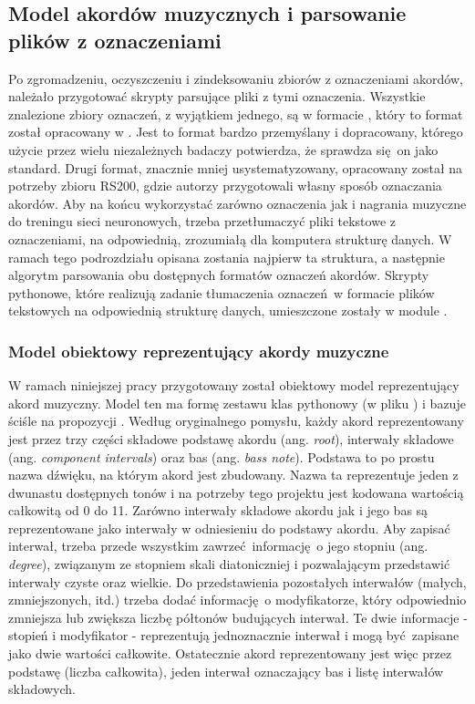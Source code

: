 \subsection{Model akordów muzycznych i parsowanie plików z oznaczeniami}

Po zgromadzeniu, oczyszczeniu i zindeksowaniu zbiorów z oznaczeniami akordów, należało przygotować
skrypty parsujące pliki z tymi oznaczenia. Wszystkie znalezione zbiory oznaczeń, z wyjątkiem
jednego, są w formacie , który to format został opracowany w \cite{harte_towards_nodate}.
Jest to format bardzo przemyślany i dopracowany, którego użycie przez wielu niezależnych badaczy
potwierdza, że sprawdza się on jako standard. Drugi format, znacznie mniej usystematyzowany,
opracowany został na potrzeby zbioru RS200, gdzie autorzy przygotowali własny sposób oznaczania
akordów. Aby na końcu wykorzystać zarówno oznaczenia jak i nagrania muzyczne do treningu sieci
neuronowych, trzeba przetłumaczyć pliki tekstowe z oznaczeniami, na odpowiednią, zrozumiałą dla
komputera strukturę danych. W ramach tego podrozdziału opisana zostania najpierw ta struktura, a
następnie algorytm parsowania obu dostępnych formatów oznaczeń akordów. Skrypty pythonowe, które
realizują zadanie tłumaczenia oznaczeń w formacie plików tekstowych na odpowiednią strukturę danych,
umieszczone zostały w module .

\subsubsection{Model obiektowy reprezentujący akordy muzyczne}

W ramach niniejszej pracy przygotowany został obiektowy model reprezentujący akord muzyczny. Model
ten ma formę zestawu klas pythonowy (w pliku ) i bazuje
ściśle na propozycji \cite{harte_towards_nodate}. Według oryginalnego pomysłu, każdy akord
reprezentowany jest przez trzy części składowe podstawę akordu (ang. \emph{root}), interwały
składowe (ang. \emph{component intervals}) oraz bas (ang. \emph{bass note}). Podstawa to po prostu
nazwa dźwięku, na którym akord jest zbudowany. Nazwa ta reprezentuje jeden z dwunastu dostępnych
tonów i na potrzeby tego projektu jest kodowana wartością całkowitą od 0 do 11. Zarówno interwały
składowe akordu jak i jego bas są reprezentowane jako interwały w odniesieniu do podstawy akordu.
Aby zapisać interwał, trzeba przede wszystkim zawrzeć informację o jego stopniu (ang.
\emph{degree}), związanym ze stopniem skali diatoniczniej i pozwalającym przedstawić interwały czyste oraz
wielkie. Do przedstawienia pozostałych interwałów (małych, zmniejszonych, itd.) trzeba dodać
informację o modyfikatorze, który odpowiednio zmniejsza lub zwiększa liczbę półtonów budujących
interwał. Te dwie informacje - stopień i modyfikator - reprezentują jednoznacznie interwał i mogą
być zapisane jako dwie wartości całkowite. Ostatecznie akord reprezentowany jest więc przez podstawę
(liczba całkowita), jeden interwał oznaczający bas i listę interwałów składowych.

